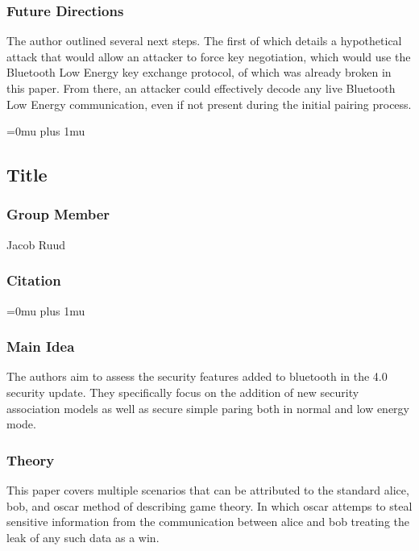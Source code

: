 \subsubsection{Future Directions}

\noindent
The author outlined several next steps.  The first of which details a hypothetical attack that would allow an attacker to force key negotiation, which would use the Bluetooth Low Energy key exchange protocol, of which was already broken in this paper.  From there, an attacker could effectively decode any live Bluetooth Low Energy communication, even if not present during the initial pairing process.

\Urlmuskip=0mu plus 1mu\relax

\noindent
\subsection{Title}

\subsubsection{Group Member}

\noindent
Jacob Ruud
\noindent
\subsubsection{Citation}

\Urlmuskip=0mu plus 1mu\relax

\subsubsection{Main Idea}

\noindent
The authors aim to assess the security features added to bluetooth in the 4.0 security update. They specifically focus on the addition of new security association models as well as secure simple paring both in normal and low energy mode.

\subsubsection{Theory}

\noindent
This paper covers multiple scenarios that can be attributed to the standard alice, bob, and oscar method of describing game theory. In which oscar attemps to steal sensitive information from the communication between alice and bob treating the leak of any such data as a win.

